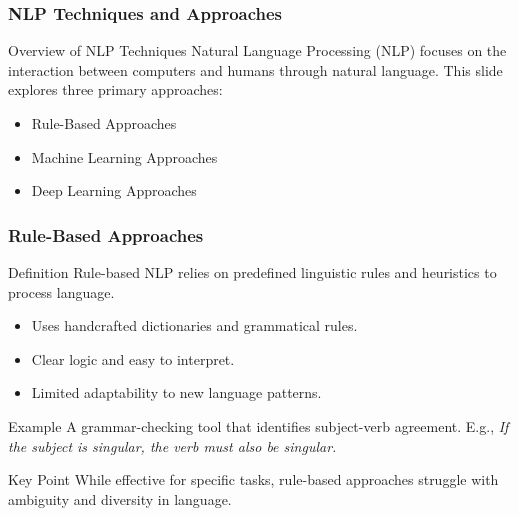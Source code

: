 \documentclass{beamer}
\begin{document}
\begin{frame}[fragile]
    \frametitle{NLP Techniques and Approaches}
    \begin{block}{Overview of NLP Techniques}
        Natural Language Processing (NLP) focuses on the interaction between computers and humans through natural language. 
        This slide explores three primary approaches:
        \begin{itemize}
            \item Rule-Based Approaches
            \item Machine Learning Approaches
            \item Deep Learning Approaches
        \end{itemize}
    \end{block}
\end{frame}

\begin{frame}[fragile]
    \frametitle{Rule-Based Approaches}
    \begin{block}{Definition}
        Rule-based NLP relies on predefined linguistic rules and heuristics to process language.
    \end{block}
    \begin{itemize}
        \item Uses handcrafted dictionaries and grammatical rules.
        \item Clear logic and easy to interpret.
        \item Limited adaptability to new language patterns.
    \end{itemize}
    \begin{block}{Example}
        A grammar-checking tool that identifies subject-verb agreement. E.g., 
        \textit{If the subject is singular, the verb must also be singular.}
    \end{block}
    \begin{block}{Key Point}
        While effective for specific tasks, rule-based approaches struggle with ambiguity and diversity in language.
    \end{block}
\end{frame}
\end{document}

